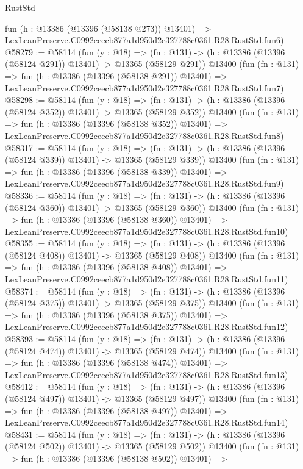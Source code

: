 \begin{lexlean}{RustStd}
\begin{coremodule}
    fun (h : @13386 (@13396 (@58138 @273)) @13401) =>
    LexLeanPreserve.C0992ceecb877a1d950d2e327788c0361.R28.RustStd.fun6)
@58279 := @58114
    (fun (y : @18) =>
    (fn : @131) -> (h : @13386 (@13396 (@58124 @291)) @13401) -> @13365 (@58129 @291))
    @13400
    (fun (fn : @131) =>
    fun (h : @13386 (@13396 (@58138 @291)) @13401) =>
    LexLeanPreserve.C0992ceecb877a1d950d2e327788c0361.R28.RustStd.fun7)
@58298 := @58114
    (fun (y : @18) =>
    (fn : @131) -> (h : @13386 (@13396 (@58124 @352)) @13401) -> @13365 (@58129 @352))
    @13400
    (fun (fn : @131) =>
    fun (h : @13386 (@13396 (@58138 @352)) @13401) =>
    LexLeanPreserve.C0992ceecb877a1d950d2e327788c0361.R28.RustStd.fun8)
@58317 := @58114
    (fun (y : @18) =>
    (fn : @131) -> (h : @13386 (@13396 (@58124 @339)) @13401) -> @13365 (@58129 @339))
    @13400
    (fun (fn : @131) =>
    fun (h : @13386 (@13396 (@58138 @339)) @13401) =>
    LexLeanPreserve.C0992ceecb877a1d950d2e327788c0361.R28.RustStd.fun9)
@58336 := @58114
    (fun (y : @18) =>
    (fn : @131) -> (h : @13386 (@13396 (@58124 @360)) @13401) -> @13365 (@58129 @360))
    @13400
    (fun (fn : @131) =>
    fun (h : @13386 (@13396 (@58138 @360)) @13401) =>
    LexLeanPreserve.C0992ceecb877a1d950d2e327788c0361.R28.RustStd.fun10)
@58355 := @58114
    (fun (y : @18) =>
    (fn : @131) -> (h : @13386 (@13396 (@58124 @408)) @13401) -> @13365 (@58129 @408))
    @13400
    (fun (fn : @131) =>
    fun (h : @13386 (@13396 (@58138 @408)) @13401) =>
    LexLeanPreserve.C0992ceecb877a1d950d2e327788c0361.R28.RustStd.fun11)
@58374 := @58114
    (fun (y : @18) =>
    (fn : @131) -> (h : @13386 (@13396 (@58124 @375)) @13401) -> @13365 (@58129 @375))
    @13400
    (fun (fn : @131) =>
    fun (h : @13386 (@13396 (@58138 @375)) @13401) =>
    LexLeanPreserve.C0992ceecb877a1d950d2e327788c0361.R28.RustStd.fun12)
@58393 := @58114
    (fun (y : @18) =>
    (fn : @131) -> (h : @13386 (@13396 (@58124 @474)) @13401) -> @13365 (@58129 @474))
    @13400
    (fun (fn : @131) =>
    fun (h : @13386 (@13396 (@58138 @474)) @13401) =>
    LexLeanPreserve.C0992ceecb877a1d950d2e327788c0361.R28.RustStd.fun13)
@58412 := @58114
    (fun (y : @18) =>
    (fn : @131) -> (h : @13386 (@13396 (@58124 @497)) @13401) -> @13365 (@58129 @497))
    @13400
    (fun (fn : @131) =>
    fun (h : @13386 (@13396 (@58138 @497)) @13401) =>
    LexLeanPreserve.C0992ceecb877a1d950d2e327788c0361.R28.RustStd.fun14)
@58431 := @58114
    (fun (y : @18) =>
    (fn : @131) -> (h : @13386 (@13396 (@58124 @502)) @13401) -> @13365 (@58129 @502))
    @13400
    (fun (fn : @131) =>
    fun (h : @13386 (@13396 (@58138 @502)) @13401) =>

\end{coremodule}
\end{lexlean}
